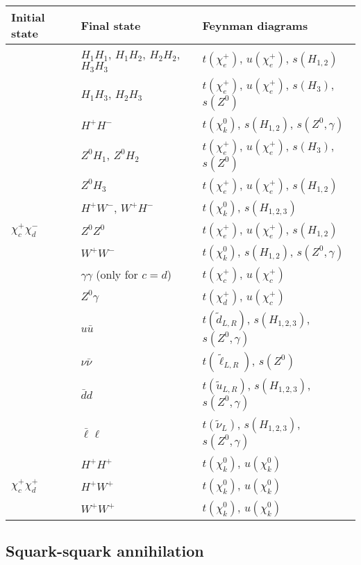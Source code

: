 \begin{center} 
\begin{tabular}{lll} \hline 
  Initial state & Final state & Feynman diagrams \\ \hline \tabspace
   & $H_1 H_1$, $H_1 H_2$, $H_2 H_2$, $H_3 H_3$ &
  $t(\chi_e^+)$, $u(\chi_e^+)$, $s(H_{1,2})$ \\
   & $H_1 H_3$, $H_2 H_3$ &
  $t(\chi_e^+)$, $u(\chi_e^+)$, $s(H_{3})$, $s(Z^0)$ \\
   & $H^+ H^-$ &
  $t(\chi_k^0)$, $s(H_{1,2})$, $s(Z^0,\gamma)$ \\
   & $Z^0 H_1$, $Z^0 H_2$ &
  $t(\chi_e^+)$, $u(\chi_e^+)$, $s(H_{3})$, $s(Z^0)$ \\
   & $Z^0 H_3$ &
  $t(\chi_e^+)$, $u(\chi_e^+)$, $s(H_{1,2})$ \\
   & $H^+ W^-$, $W^+ H^-$ &
  $t(\chi_k^0)$, $s(H_{1,2,3})$ \\
  $\chi_c^+ \chi_d^-$ & $Z^0 Z^0$ &
  $t(\chi_e^+)$, $u(\chi_e^+)$, $s(H_{1,2})$ \\
   & $W^+ W^-$ &
  $t(\chi_k^0)$, $s(H_{1,2})$, $s(Z^0, \gamma)$ \\
   & $\gamma \gamma$ (only for $c=d$) &
  $t(\chi_c^+)$, $u(\chi_c^+)$ \\
   & $Z^0 \gamma$ &
  $t(\chi_d^+)$, $u(\chi_c^+)$ \\
   & $u \bar{u}$ &
  $t(\tilde{d}_{L,R})$, $s(H_{1,2,3})$, $s(Z^0, \gamma)$ \\
   & $\nu \bar{\nu}$ &
  $t(\tilde{\ell}_{L,R})$, $s(Z^0)$ \\
   & $\bar{d} d$ &
  $t(\tilde{u}_{L,R})$, $s(H_{1,2,3})$, $s(Z^0, \gamma)$ \\
   & $\bar{\ell} \ell$ &
  $t(\tilde{\nu}_{L})$, $s(H_{1,2,3})$, $s(Z^0, \gamma)$ \\ \hline
   & $H^+ H^+$ &
  $t(\chi_k^0)$, $u(\chi_k^0)$ \\
  $\chi_c^+ \chi_d^+$ & $H^+ W^+$ &
  $t(\chi_k^0)$, $u(\chi_k^0)$ \\
   & $W^+ W^+$ &
  $t(\chi_k^0)$, $u(\chi_k^0)$ \\ \hline
\end{tabular}
\end{center}


\subsection{Squark-squark annihilation}

